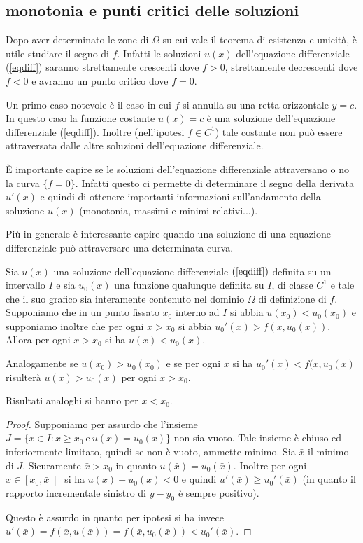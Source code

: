 \subsection{monotonia e punti critici delle soluzioni}

Dopo aver determinato le zone di $\Omega$ su cui vale il teorema di
esistenza e unicit\`a, \`e utile studiare il segno di $f$. Infatti
le soluzioni $u(x)$ dell'equazione differenziale (\ref{eqdiff})
saranno strettamente crescenti dove $f>0$, strettamente decrescenti
dove $f<0$ e avranno un punto critico dove $f=0$.

Un primo caso notevole è il caso in cui $f$ si annulla su una
retta orizzontale $y=c$.
In questo caso la funzione costante $u(x)=c$ è una
soluzione dell'equazione differenziale (\ref{eqdiff}).
Inoltre
(nell'ipotesi $f\in C^1$) tale costante non può essere
attraversata dalle altre soluzioni dell'equazione differenziale.

\`E importante capire se le soluzioni dell'equazione differenziale
attraversano o no la curva $\{f=0\}$. Infatti questo ci permette di
determinare il segno della derivata $u'(x)$ e quindi di ottenere
importanti informazioni sull'andamento della soluzione $u(x)$
(monotonia, massimi e minimi relativi...).

Più in generale è interessante capire quando una soluzione di una
equazione differenziale può attraversare una determinata curva.

\begin{theorem}\label{nonpassa}
Sia $u(x)$ una soluzione dell'equazione differenziale $(\ref{eqdiff})$
definita su un intervallo $I$ e sia $u_0(x)$ una funzione qualunque
definita su $I$, di classe $C^1$ e tale che il suo grafico sia
interamente contenuto nel dominio $\Omega$ di definizione di $f$.
Supponiamo che in un punto fissato $x_0$ interno ad $I$ si abbia
$u(x_0)<u_0(x_0)$ e supponiamo inoltre che per ogni $x>x_0$ si abbia
$u_0'(x)>f(x,u_0(x))$. Allora per ogni $x>x_0$ si ha $u(x)<u_0(x)$.

Analogamente se $u(x_0)>u_0(x_0)$ e se per ogni $x$ si ha
$u_0'(x)<f(x,u_0(x)$ risulterà $u(x)>u_0(x)$ per ogni $x>x_0$.

Risultati analoghi si hanno per $x<x_0$.
\end{theorem}

\begin{proof}
Supponiamo per assurdo che l'insieme $J=\{x\in I: x\ge x_0\
\mathrm{e}\ u(x)=u_0(x)\}$ non sia vuoto.
Tale insieme è chiuso ed
inferiormente limitato, quindi se non è vuoto, ammette minimo.
Sia $\bar x$ il minimo di $J$.
Sicuramente $\bar x>x_0$ in quanto $u(\bar
x)=u_0(\bar x)$.
Inoltre per ogni $x\in \left[x_0,\bar x\right[$ si ha
$u(x)-u_0(x)<0$ e quindi $u'(\bar x) \ge u_0'(\bar x)$ (in quanto
il rapporto incrementale sinistro di $y-y_0$ è sempre positivo).

Questo è assurdo in quanto per ipotesi si ha invece $u'(\bar x) =
f(\bar x, u(\bar x)) = f(\bar x ,u_0(\bar x)) < u_0'(\bar x)$.
\end{proof}

